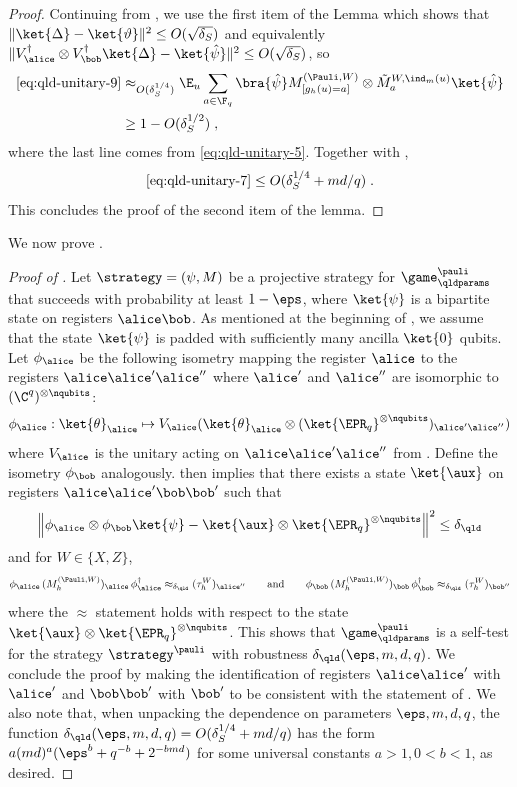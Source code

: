 \begin{proof}
	Continuing from , we use the first item of the Lemma which shows that $\| \ket{\Delta} - \ket{\vartheta} \|^2 \leq O(\sqrt{\delta_S})$ and equivalently $\| V_\alice^\dagger \otimes V_\bob^\dagger \ket{\Delta} - \ket{\hat{\psi}} \|^2 \leq O(\sqrt{\delta_S})$, so 
	\begin{align*}
		\text{\cref{eq:qld-unitary-9}} &\approx_{O(\delta_S^{1/4})} \E_u \sum_{a \in \F_q} \bra{\hat{\psi}} M^{(\Pauli,W)}_{[g_h(u)=a]} \otimes \tilde{M}^{W,\ind_m(u)}_a \ket{\hat{\psi}} \\
		&\geq 1 - O(\delta_S^{1/2})\;,
	\end{align*}
        where the last line comes from \eqref{eq:qld-unitary-5}.
	Together with , 
	\[
	\text{\cref{eq:qld-unitary-7}} \leq O(\delta_S^{1/4} + md/q)\;.	
	\]
	This concludes the proof of the second item of the lemma.
\end{proof}

We now prove . 
\begin{proof}[Proof of ]
	Let $\strategy = (\psi,M)$ be a projective strategy for $\game^\pauli_\qldparams$ that succeeds with probability at least $1 - \eps$, where $\ket{\psi}$ is a bipartite state on registers $\alice \bob$. As mentioned at the beginning of , we assume that the state $\ket{\psi}$ is padded with sufficiently many ancilla $\ket{0}$ qubits. Let $\phi_\alice$ be the following isometry mapping the register $\alice$ to the registers $\alice \alice' \alice''$ where $\alice'$ and $\alice''$ are isomorphic to $(\C^q)^{\otimes \nqubits}$:
	\[
		\phi_\alice: \ket{\theta}_\alice \mapsto V_\alice (\ket{\theta}_\alice \otimes (\ket{\EPR_q}^{\otimes \nqubits})_{\alice' \alice''})
	\]
	where $V_\alice$ is the unitary acting on $\alice \alice' \alice''$ from . Define the isometry $\phi_\bob$ analogously.  then implies that there exists a state $\ket{\aux}$ on registers $\alice \alice' \bob \bob'$ such that
	\[
		\left \| \phi_\alice \otimes \phi_\bob \ket{\psi} - \ket{\aux} \otimes \ket{\EPR_q}^{\otimes \nqubits} \right \|^2 \leq \delta_\qld
	\]
	and for $W \in \{X,Z\}$,
	\[
		\phi_\alice \, (M^{(\Pauli,W)}_h)_\alice \, \phi_\alice^\dagger \approx_{\delta_\qld} (\tau^W_h)_{\alice''} \qquad \text{and} \qquad \phi_\bob \, (M^{(\Pauli,W)}_h)_\bob \, \phi_\bob^\dagger \approx_{\delta_\qld} (\tau^W_h)_{\bob''}
	\]
	where the $\approx$ statement holds with respect to the state $\ket{\aux} \otimes \ket{\EPR_q}^{\otimes \nqubits}$. This shows that $\game^\pauli_\qldparams$ is a self-test for the strategy $\strategy^\pauli$ with robustness $\delta_\qld(\eps,m,d,q)$. We conclude the proof by making the identification of registers $\alice \alice'$ with $\alice'$ and $\bob \bob'$ with $\bob'$ to be consistent with the statement of . We also note that, when unpacking the dependence on parameters $\eps, m, d, q$, the function $\delta_\qld(\eps,m,d,q) = O(\delta_S^{1/4} + md/q)$ has the form $a(md)^a(\eps^b + q^{-b} + 2^{-bmd})$ for some universal constants $a > 1, 0 < b < 1$, as desired.
\end{proof}
 

 










		
